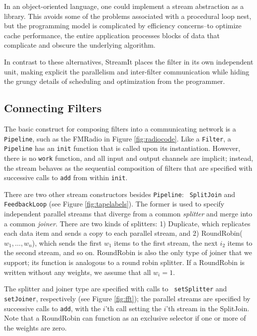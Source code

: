 In an object-oriented language, one could implement a stream
abstraction as a library.  This avoids some of the problems associated
with a procedural loop nest, but the programming model is complicated
by efficiency concerns--to optimize cache performance, the entire
application processes blocks of data that complicate and obscure the
underlying algorithm.

In contrast to these alternatives, StreamIt places the filter in its
own independent unit, making explicit the parallelism and inter-filter
communication while hiding the grungy details of scheduling and
optimization from the programmer.

\subsection{Connecting Filters}
\label{sec:connecting}

The basic construct for composing filters into a communicating network
is a {\tt Pipeline}, such as the FMRadio in Figure
\ref{fig:radiocode}.  Like a {\tt Filter}, a {\tt Pipeline} has an
{\tt init} function that is called upon its instantiation.  However,
there is no {\tt work} function, and all input and output channels are
implicit; instead, the stream behaves as the sequential composition of
filters that are specified with successive calls to {\tt add} from
within {\tt init}.

There are two other stream constructors besides {\tt Pipeline}: {\tt
SplitJoin} and {\tt FeedbackLoop} (see Figure \ref{fig:tapelabels}).
The former is used to specify independent parallel streams that
diverge from a common {\it splitter} and merge into a common {\it
joiner}.  There are two kinds of splitters: 1) Duplicate, which
replicates each data item and sends a copy to each parallel stream,
and 2) RoundRobin($w_1, \dots, w_n$), which sends the first $w_1$
items to the first stream, the next $i_2$ items to the second stream,
and so on.  RoundRobin is also the only type of joiner that we
support; its function is analogous to a round robin splitter.  If a
RoundRobin is written without any weights, we assume that all $w_i =
1$.

The splitter and joiner type are specified with calls to {\tt
setSplitter} and {\tt setJoiner}, respectively (see Figure
\ref{fig:fft}); the parallel streams are specified by successive calls
to {\tt add}, with the $i$'th call setting the $i$'th stream in the
SplitJoin.  Note that a RoundRobin can function as an exclusive
selector if one or more of the weights are zero.

